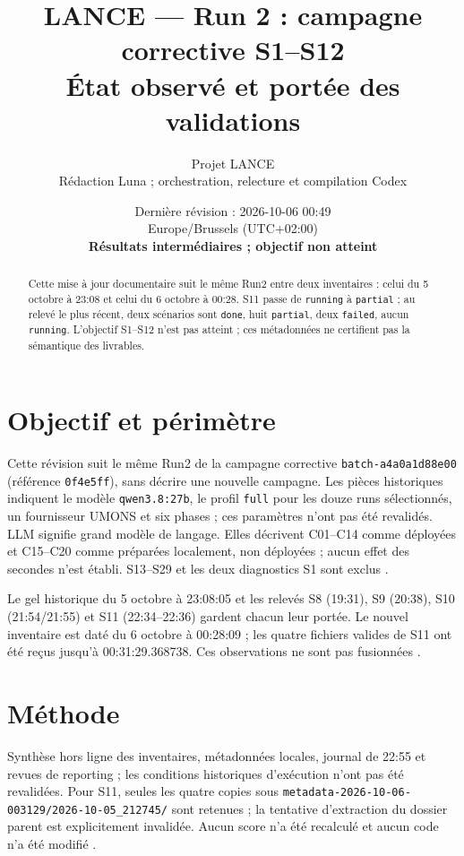 \documentclass[11pt,a4paper]{article}
\title{LANCE — Run 2 : campagne corrective S1–S12\\\large État observé et portée des validations}
\author{Projet LANCE\\\small Rédaction Luna ; orchestration, relecture et compilation Codex}
\date{Dernière révision : 2026-10-06 00:49\\Europe/Brussels (UTC+02:00)\\\textbf{Résultats intermédiaires ; objectif non atteint}}
\newcommand{\code}[1]{{\urlstyle{tt}\nolinkurl{#1}}}
\begin{document}
\maketitle
\begin{abstract}
Cette mise à jour documentaire suit le même Run2 entre deux inventaires : celui du 5 octobre à 23:08 et celui du 6 octobre à 00:28. S11 passe de \code{running} à \code{partial} ; au relevé le plus récent, deux scénarios sont \code{done}, huit \code{partial}, deux \code{failed}, aucun \code{running}. L'objectif S1–S12 n'est pas atteint ; ces métadonnées ne certifient pas la sémantique des livrables.
\end{abstract}
\tableofcontents
\section{Objectif et périmètre}
Cette révision suit le même Run2 de la campagne corrective \code{batch-a4a0a1d88e00} (référence \code{0f4e5ff}), sans décrire une nouvelle campagne. Les pièces historiques indiquent le modèle \code{qwen3.8:27b}, le profil \code{full} pour les douze runs sélectionnés, un fournisseur UMONS et six phases ; ces paramètres n'ont pas été revalidés. LLM signifie grand modèle de langage. Elles décrivent C01–C14 comme déployées et C15–C20 comme préparées localement, non déployées ; aucun effet des secondes n'est établi. S13–S29 et les deux diagnostics S1 sont exclus \cite{journal,inv}.

Le gel historique du 5 octobre à 23:08:05 et les relevés S8 (19:31), S9 (20:38), S10 (21:54/21:55) et S11 (22:34–22:36) gardent chacun leur portée. Le nouvel inventaire est daté du 6 octobre à 00:28:09 ; les quatre fichiers valides de S11 ont été reçus jusqu'à 00:31:29.368738. Ces observations ne sont pas fusionnées \cite{inv,snapshots,inv6}.
\section{Méthode}
Synthèse hors ligne des inventaires, métadonnées locales, journal de 22:55 et revues de reporting ; les conditions historiques d'exécution n'ont pas été revalidées. Pour S11, seules les quatre copies sous \code{metadata-2026-10-06-003129/2026-10-05_212745/} sont retenues ; la tentative d'extraction du dossier parent est explicitement invalidée. Aucun score n'a été recalculé et aucun code n'a été modifié \cite{journal,inv,snapshots,inv6,report}.
\end{document}
